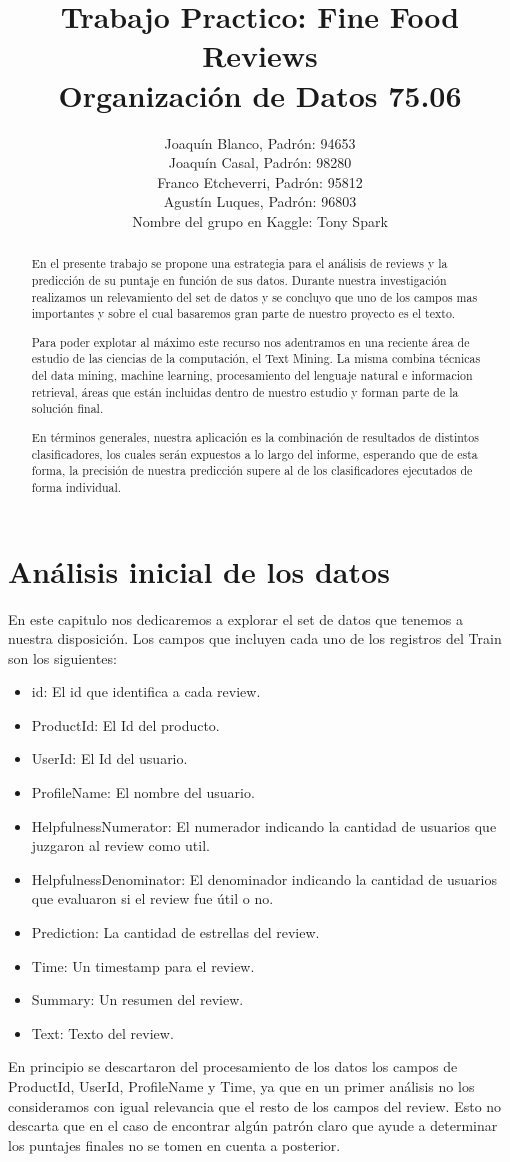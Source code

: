 \documentclass[a4paper,11pt]{report}
\title{Trabajo Practico: Fine Food Reviews\\Organización de Datos 75.06}
\author{Joaquín Blanco, Padrón: 94653\\
Joaquín Casal, Padrón: 98280\\
Franco Etcheverri, Padrón: 95812\\
Agustín Luques, Padrón: 96803\\
Nombre del grupo en Kaggle: Tony Spark}
\begin{document}
\maketitle
\tableofcontents

\begin{abstract}
En el presente trabajo se propone una estrategia para el análisis de reviews y la predicción de su puntaje en función de sus datos. Durante nuestra investigación realizamos un relevamiento del set de datos y se concluyo que uno de los campos mas importantes y sobre el cual basaremos gran parte de nuestro proyecto es el texto. 

Para poder explotar al máximo este recurso nos adentramos en una reciente área de estudio de las ciencias de la computación, el Text Mining. La misma combina técnicas del data mining, machine learning, procesamiento del lenguaje natural e informacion retrieval, áreas que están incluidas dentro de nuestro estudio y forman parte de la solución final. 

En términos generales, nuestra aplicación es la combinación de resultados de distintos clasificadores, los cuales serán expuestos a lo largo del informe, esperando que de esta forma, la precisión de nuestra predicción supere al de los clasificadores ejecutados de forma individual. 
\end{abstract}

\chapter{Análisis inicial de los datos}
En este capitulo nos dedicaremos a explorar el set de datos que tenemos a nuestra disposición. Los campos que incluyen cada uno de los registros del Train son los siguientes:

\begin{itemize}
  \item id: El id que identifica a cada review.
  \item ProductId: El Id del producto.
  \item UserId: El Id del usuario.
  \item ProfileName: El nombre del usuario. 
  \item HelpfulnessNumerator: El numerador indicando la cantidad de usuarios que juzgaron al review como util.
  \item HelpfulnessDenominator: El denominador indicando la cantidad de usuarios que evaluaron si el review fue útil o no.
  \item Prediction: La cantidad de estrellas del review.
  \item Time: Un timestamp para el review.
  \item Summary: Un resumen del review.
  \item Text: Texto del review.
\end{itemize}
En principio se descartaron del procesamiento de los datos los campos de ProductId, UserId, ProfileName y Time, ya que en un primer análisis no los consideramos con igual relevancia que el resto de los campos del review. Esto no descarta que en el caso de encontrar algún patrón claro que ayude a determinar los puntajes finales no se tomen en cuenta a posterior.
\end{document}
